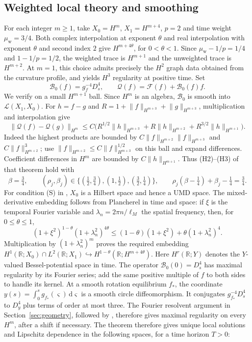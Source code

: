 \documentclass[a4paper,11pt]{article}
\numberwithin{equation}{section}
\theoremstyle{definition}
\theoremstyle{remark}
\newcommand{\R}{\mathbb R}
\newcommand{\dd}{\,\mathrm d}
\newcommand{\norm}[1]{\lVert#1\rVert}
\newcommand{\calF}{\mathcal F}
\begin{document}
\subsection{Weighted local theory and smoothing}
For each integer $m\ge1$, take $X_0=H^m$, $X_1=H^{m+4}$, $p=2$ and time weight $\mu_{\mathrm w}=3/4$. Both complex interpolation at exponent $\theta$ and real interpolation with exponent $\theta$ and second index $2$ give $H^{m+4\theta}$, for $0<\theta<1$. Since $\mu_{\mathrm w}-1/p=1/4$ and $1-1/p=1/2$, the weighted trace is $H^{m+1}$ and the unweighted trace is $H^{m+2}$. At $m=1$, this choice admits precisely the $H^2$ graph data obtained from the curvature profile, and yields $H^3$ regularity at positive time. Set
\[
 \mathcal B_0(f)=g_f^{-4}D_s^4,\qquad
 \mathcal Q(f)=\calF(f)+\mathcal B_0(f)f.
\]
We verify \cite[Theorem~1.2]{PSW} on a small $H^{m+1}$ ball. Since $H^m$ is an algebra, $\mathcal B_0$ is smooth into $\mathcal L(X_1,X_0)$. For $h=f-g$ and $R=1+\norm f_{H^{m+3}}+\norm g_{H^{m+3}}$, multiplication and interpolation give
\begin{equation}\label{eq:weighted-products}
 \norm{\mathcal Q(f)-\mathcal Q(g)}_{H^m}
 \le C\big(R^{1/2}\norm h_{H^{m+3}}+R\norm h_{H^{m+2}}
                 +R^{3/2}\norm h_{H^{m+1}}\big).
\end{equation}
Indeed the highest products are bounded by
$C\norm f_{H^{m+2}}\norm f_{H^{m+3}}$ and $C\norm f_{H^{m+2}}^3$;
use $\norm f_{H^{m+2}}\le C\norm f_{H^{m+3}}^{1/2}$ on this ball and expand differences. Coefficient differences in $H^m$ are bounded by $C\norm h_{H^{m+1}}$.
Thus (H2)--(H3) of that theorem hold with
\[
 \beta=\tfrac34,\qquad
 (\rho_j,\beta_j)\in\{(\tfrac12,\tfrac34),(1,\tfrac12),(\tfrac32,\tfrac14)\},
 \qquad \rho_j(\beta-\tfrac14)+\beta_j-\tfrac14=\tfrac34.
\]
For condition (S) in \cite{PSW}, $X_0$ is a Hilbert space and hence a UMD space. The mixed-derivative embedding follows from Plancherel in time and space: if $\xi$ is the temporal Fourier variable and $\lambda_n=2\pi n/\ell_M$ the spatial frequency, then, for $0\le\theta\le1$,
\[
 (1+\xi^2)^{1-\theta}(1+\lambda_n^2)^{4\theta}
 \le(1-\theta)(1+\xi^2)+\theta(1+\lambda_n^2)^4.
\]
Multiplication by $(1+\lambda_n^2)^m$ proves the required embedding $H^1(\R;X_0)\cap L^2(\R;X_1)\hookrightarrow H^{1-\theta}(\R;H^{m+4\theta})$. Here $H^r(\R;Y)$ denotes the $Y$-valued Bessel-potential space in time. The operator $\mathcal B_0(0)=D_s^4$ has maximal regularity by its Fourier series; add the same positive multiple of $f$ to both sides to handle its kernel. At a smooth rotation equilibrium $f_*$, the coordinate $y(s)=\int_0^s g_{f_*}(\varsigma)\dd\varsigma$ is a smooth circle diffeomorphism. It conjugates $g_{f_*}^{-4}D_s^4$ to $D_y^4$ plus terms of order at most three. The Fourier resolvent argument in Section~\ref{sec:geometry}, followed by \cite{deSimon}, therefore gives maximal regularity on every $H^m$, after a shift if necessary. The theorem therefore gives unique local solutions and Lipschitz dependence in the following spaces, for a time horizon $T>0$:
\end{document}
